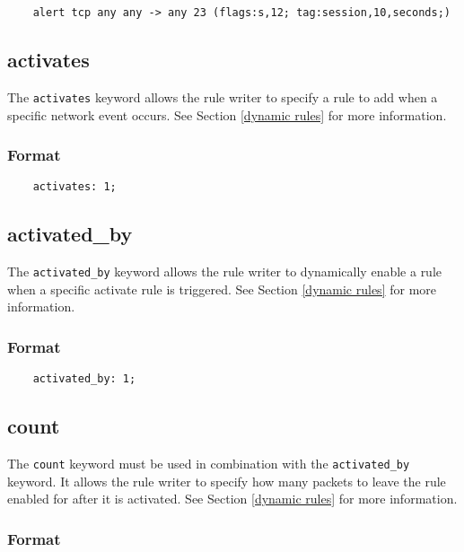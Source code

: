 \documentclass[english]{report}
\begin{document}
\begin{verbatim}
    alert tcp any any -> any 23 (flags:s,12; tag:session,10,seconds;)
\end{verbatim}

\subsection{activates}

The \texttt{activates} keyword allows the rule writer to specify a rule to add
when a specific network event occurs. See Section \ref{dynamic rules} for more
information.

\subsubsection{Format}

\begin{verbatim}
    activates: 1;
\end{verbatim}

\subsection{activated\_by}

The \texttt{activated\_by} keyword allows the rule writer to dynamically enable
a rule when a specific activate rule is triggered.  See Section \ref{dynamic
rules} for more information.

\subsubsection{Format}

\begin{verbatim}
    activated_by: 1;
\end{verbatim}

\subsection{count}

The \texttt{count} keyword must be used in combination with the
\texttt{activated\_by} keyword.  It allows the rule writer to specify how many
packets to leave the rule enabled for after it is activated.  See Section
\ref{dynamic rules} for more information.

\subsubsection{Format}
\end{document}
